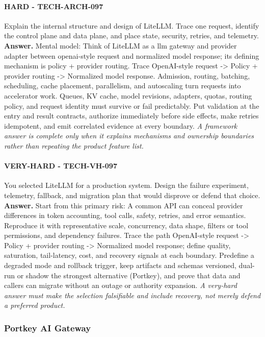 \paragraph{HARD - TECH-ARCH-097} Explain the internal structure and design of LiteLLM. Trace one request, identify the control plane and data plane, and place state, security, retries, and telemetry.
\textbf{Answer.} Mental model: Think of LiteLLM as a llm gateway and provider adapter between openai-style request and normalized model response; its defining mechanism is policy + provider routing. Trace OpenAI-style request -> Policy + provider routing -> Normalized model response. Admission, routing, batching, scheduling, cache placement, parallelism, and autoscaling turn requests into accelerator work. Queues, KV cache, model revisions, adapters, quotas, routing policy, and request identity must survive or fail predictably. Put validation at the entry and result contracts, authorize immediately before side effects, make retries idempotent, and emit correlated evidence at every boundary.
\textit{A framework answer is complete only when it explains mechanisms and ownership boundaries rather than repeating the product feature list.}
\paragraph{VERY-HARD - TECH-VH-097} You selected LiteLLM for a production system. Design the failure experiment, telemetry, fallback, and migration plan that would disprove or defend that choice.
\textbf{Answer.} Start from this primary risk: A common API can conceal provider differences in token accounting, tool calls, safety, retries, and error semantics. Reproduce it with representative scale, concurrency, data shape, filters or tool permissions, and dependency failures. Trace the path OpenAI-style request -> Policy + provider routing -> Normalized model response; define quality, saturation, tail-latency, cost, and recovery signals at each boundary. Predefine a degraded mode and rollback trigger, keep artifacts and schemas versioned, dual-run or shadow the strongest alternative (Portkey), and prove that data and callers can migrate without an outage or authority expansion.
\textit{A very-hard answer must make the selection falsifiable and include recovery, not merely defend a preferred product.}
\subsubsection*{Portkey AI Gateway}
